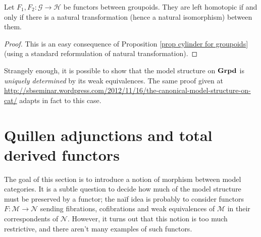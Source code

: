 \begin{refsection}
\begin{cor}
Let $F_1,F_2 \colon \mathcal G \to \mathcal H$ be functors between groupoids. They are left homotopic if and only if there is a natural transformation (hence a natural isomorphism) between them.
\end{cor}

\begin{proof}
This is an easy consequence of Proposition \ref{prop cylinder for groupoids} (using a standard reformulation of natural transformation).
\end{proof}

\begin{rmk}
Strangely enough, it is possible to show that the model structure on $\mathbf{Grpd}$ is \emph{uniquely determined} by its weak equivalences. The same proof given at \url{http://sbseminar.wordpress.com/2012/11/16/the-canonical-model-structure-on-cat/} adapts in fact to this case.
\end{rmk}

%
%

\section{Quillen adjunctions and total derived functors}

The goal of this section is to introduce a notion of morphism between model categories. It is a subtle question to decide how much of the model structure must be preserved by a functor; the na\"if idea is probably to consider functors $F \colon \mathcal M \to \mathcal N$ sending fibrations, cofibrations and weak equivalences of $\mathcal M$ in their correspondents of $\mathcal N$. However, it turns out that this notion is too much restrictive, and there aren't many examples of such functors.


\end{refsection}
